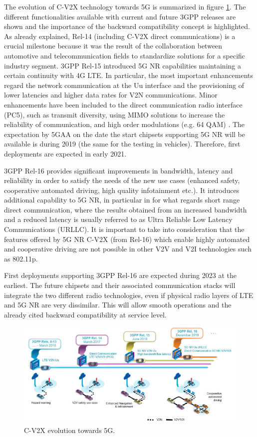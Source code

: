 \documentclass[conference,12pt,onecolumn]{IEEEtran}
\begin{document}
The evolution of C-V2X technology towards 5G is summarized in figure \ref{fig:evolution}. The different functionalities available with current and future 3GPP releases are shown and the importance of the backward compatibility concept is highlighted. As already explained, Rel-14 (including C-V2X direct communications) is a crucial milestone because it was the result of the collaboration between automotive and telecommunication fields to standardize solutions for a specific industry segment. 3GPP Rel-15 introduced 5G NR capabilities maintaining a certain continuity with 4G LTE. In particular, the most important enhancements regard the network communication at the Uu interface and the provisioning of lower latencies and higher data rates for V2N communications. Minor enhancements have been included to the direct communication radio interface (PC5), such as transmit diversity, using MIMO solutions to increase the reliability of communication, and high order modulations (e.g. 64 QAM) \cite{5GAAwhite}. The expectation by 5GAA on the date the start chipsets supporting 5G NR will be available is during 2019 (the same for the testing in vehicles). Therefore, first deployments are expected in early 2021. 

3GPP Rel-16 provides significant improvements in bandwidth, latency and reliability in order to satisfy the needs of the new use cases (enhanced safety, cooperative automated driving, high quality infotainment etc.). It introduces additional capability to 5G NR, in particular in for what regards short range direct communication, where the results obtained from an increased bandwidth and a reduced latency is usually referred to as Ultra Reliable Low Latency Communications (URLLC). It is important to take into consideration that the features offered by 5G NR C-V2X (from Rel-16) which enable highly automated and cooperative driving are not possible in other V2V and V2I technologies such as 802.11p. 

First deployments supporting 3GPP Rel-16 are expected during 2023 at the earliest. The future chipsets and their associated communication stacks will integrate the two different radio technologies, even if physical radio layers of LTE and 5G NR are very dissimilar. This will allow smooth operations and the already cited backward compatibility at service level.



\begin{figure}[ht]
   \centering
  \includegraphics[width=0.9\linewidth]{_Graphics/evolution_timeline.png}
  \caption{C-V2X evolution towards 5G. \cite{5GAAwhite}}
  \label{fig:evolution}
\end{figure}
\end{document}
